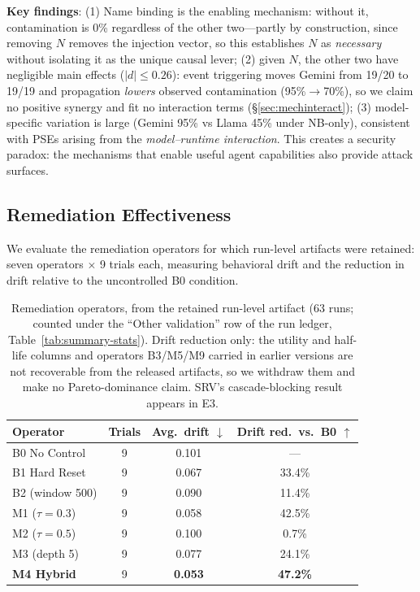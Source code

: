 \documentclass{article}
\theoremstyle{plain}
\theoremstyle{definition}
\begin{document}
\textbf{Key findings}: (1) Name binding is the enabling mechanism: without it, contamination is 0\% regardless of the other two---partly by construction, since removing $N$ removes the injection vector, so this establishes $N$ as \emph{necessary} without isolating it as the unique causal lever; (2) given $N$, the other two have negligible main effects ($|d|\leq0.26$): event triggering moves Gemini from 19/20 to 19/19 and propagation \emph{lowers} observed contamination (95\%$\to$70\%), so we claim no positive synergy and fit no interaction terms (\S\ref{sec:mechinteract}); (3) model-specific variation is large (Gemini 95\% vs Llama 45\% under NB-only), consistent with PSEs arising from the \emph{model--runtime interaction}. This creates a security paradox: the mechanisms that enable useful agent capabilities also provide attack surfaces.

\subsection{Remediation Effectiveness}

We evaluate the remediation operators for which run-level artifacts were retained: seven operators $\times$ 9 trials each, measuring behavioral drift and the reduction in drift relative to the uncontrolled B0 condition.

\begin{table}[!htbp]
\centering
\small
\setlength{\tabcolsep}{4pt}
\begin{tabular}{@{}lccc@{}}
\toprule
\textbf{Operator} & \textbf{Trials} & \textbf{Avg.\ drift $\downarrow$} & \textbf{Drift red.\ vs.\ B0 $\uparrow$} \\
\midrule
B0 No Control & 9 & 0.101 & --- \\
B1 Hard Reset & 9 & 0.067 & 33.4\% \\
B2 (window 500) & 9 & 0.090 & 11.4\% \\
M1 ($\tau{=}0.3$) & 9 & 0.058 & 42.5\% \\
M2 ($\tau{=}0.5$) & 9 & 0.100 & 0.7\% \\
M3 (depth 5) & 9 & 0.077 & 24.1\% \\
\textbf{M4 Hybrid} & 9 & \textbf{0.053} & \textbf{47.2\%} \\
\bottomrule
\end{tabular}
\caption{Remediation operators, from the retained run-level artifact (63 runs; counted under the ``Other validation'' row of the run ledger, Table~\ref{tab:summary-stats}). Drift reduction only: the utility and half-life columns and operators B3/M5/M9 carried in earlier versions are not recoverable from the released artifacts, so we withdraw them and make no Pareto-dominance claim. SRV's cascade-blocking result appears in E3.}
\label{tab:pareto-results}
\end{table}
\end{document}
